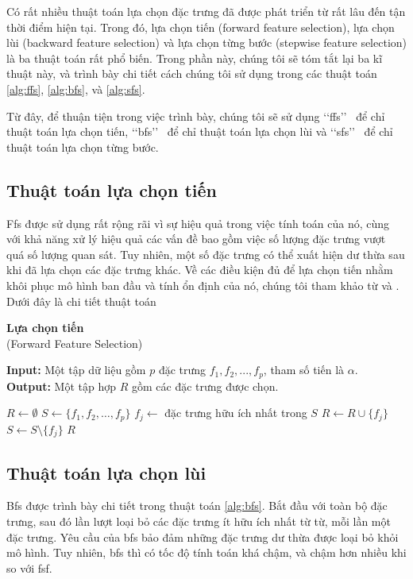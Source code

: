 Có rất nhiều thuật toán lựa chọn đặc trưng đã được phát triển từ rất lâu đến tận thời điểm hiện tại. Trong đó, lựa chọn tiến (forward feature selection), lựa chọn lùi (backward feature selection) và lựa chọn từng bước (stepwise feature selection) là ba thuật toán rất phổ biến. Trong phần này, chúng tôi sẽ tóm tắt lại ba kĩ thuật này, và trình bày chi tiết cách chúng tôi sử dụng trong các thuật toán \ref{alg:ffs}, \ref{alg:bfs}, và \ref{alg:sfs}.

Từ đây, để thuận tiện trong việc trình bày, chúng tôi sẽ sử dụng \lq\lq ffs\rq\rq~ để chỉ thuật toán lựa chọn tiến, \lq\lq bfs\rq\rq~ để chỉ thuật toán lựa chọn lùi và \lq\lq sfs\rq\rq~ để chỉ thuật toán lựa chọn từng bước.

\subsection{Thuật toán lựa chọn tiến}
Ffs được sử dụng rất rộng rãi vì sự hiệu quả trong việc tính toán của nó, cùng với khả năng xử lý hiệu quả các vấn đề bao gồm việc số lượng đặc trưng vượt quá số lượng quan sát. Tuy nhiên, một số đặc trưng có thể xuất hiện dư thừa sau khi đã lựa chọn các đặc trưng khác. Về các điều kiện đủ để lựa chọn tiến nhằm khôi phục mô hình ban đầu và tính ổn định của nó, chúng tôi tham khảo từ \cite{tropp2004greed} và \cite{donoho2005stable}. Dưới đây là chi tiết thuật toán

\begin{breakablealgorithm}
	\caption{\textbf{Lựa chọn tiến}\\
		(Forward Feature Selection)}\label{alg:ffs}
	\noindent\textbf{Input:} Một tập dữ liệu gồm $p$ đặc trưng $f_1,f_2,...,f_p$, tham số tiến là $\alpha$.\\
	\textbf{Output:} Một tập hợp $R$ gồm các đặc trưng được chọn.
	\begin{algorithmic}[1]
		\State $R \gets \emptyset$
		\State $S \gets \{f_1, f_2,\ldots, f_p\}$
		\State $f_j \gets$ đặc trưng hữu ích nhất trong $S$
		\State $R \gets R \cup \{f_j\}$
		\State $S \gets S\setminus \{f_j\}$
		\Else
		\State \Return $R$
		\EndIf
		\EndWhile
	\end{algorithmic}
\end{breakablealgorithm}

\subsection{Thuật toán lựa chọn lùi}
Bfs \cite{james2013introduction} được trình bày chi tiết trong thuật toán \ref{alg:bfs}. Bắt đầu với toàn bộ đặc trưng, sau đó lần lượt loại bỏ các đặc trưng ít hữu ích nhất từ từ, mỗi lần một đặc trưng. Yêu cầu của bfs bảo đảm những đặc trưng dư thừa được loại bỏ khỏi mô hình. Tuy nhiên, bfs thì có tốc độ tính toán khá chậm, và chậm hơn nhiều khi so với fsf.

